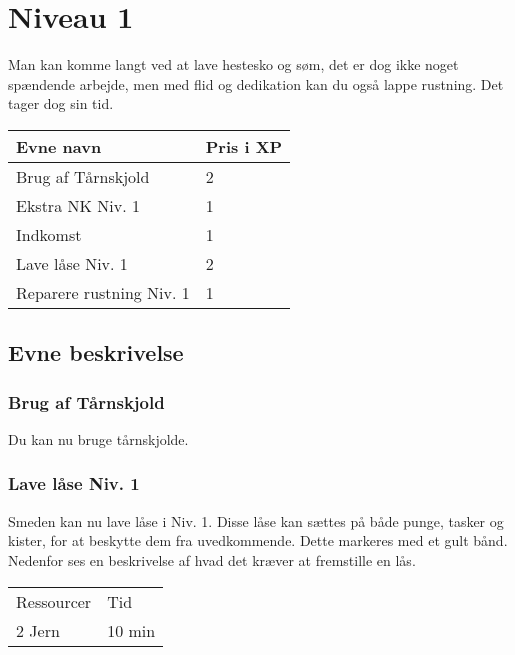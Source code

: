 \chapter{Niveau 1}
Man kan komme langt ved at lave hestesko og søm, det er dog ikke noget spændende arbejde, men med flid og dedikation kan du også lappe rustning. Det tager dog sin tid.
\begin{table}[H]
    \centering
    \begin{tabular}{|p{}|p{}|}
    \rowcolor{cerulean!80}\hline
        Evne navn & Pris i XP \\\hline
         Brug af Tårnskjold & 2 \\\hline
         Ekstra NK Niv. 1 & 1 \\\hline
         Indkomst & 1\\\hline
         Lave låse Niv. 1 & 2\\\hline
         Reparere rustning Niv. 1 & 1\\\hline
    \end{tabular}
\end{table}

\section{Evne beskrivelse}
\subsection{Brug af Tårnskjold}
Du kan nu bruge tårnskjolde.





\subsection{Lave låse Niv. 1}
Smeden kan nu lave låse i Niv. 1. Disse låse kan sættes på både punge, tasker og kister, for at beskytte dem fra uvedkommende. Dette markeres med et gult bånd.
Nedenfor ses en beskrivelse af hvad det kræver at fremstille en lås.\\

\begin{table}[H]
    \centering
    \begin{tabular}{|p{}|p{}|}
    \hline
    \rowcolor{cerulean!80}
    \multicolumn{2}{c}{Lås Niv. 1}\\
    \hline
    \rowcolor{cerulean!40}
         Ressourcer & Tid \\\hline
         2 Jern & 10 min\\\hline
    \end{tabular}
    \end{table}

